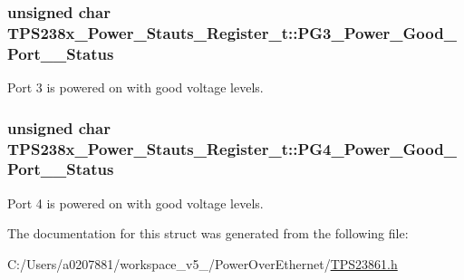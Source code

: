 \hypertarget{struct_t_p_s238x___power___stauts___register__t_a8bd40ecb8603bf9c320cd61a0b1cb0ad}{
\subsubsection[{P\-G3\-\_\-\-Power\-\_\-\-Good\-\_\-\-Port\-\_\-3\-\_\-\-Status}]{\setlength{\rightskip}{0pt plus 5cm}unsigned char T\-P\-S238x\-\_\-\-Power\-\_\-\-Stauts\-\_\-\-Register\-\_\-t\-::\-P\-G3\-\_\-\-Power\-\_\-\-Good\-\_\-\-Port\-\_\-\_\-\-Status}}\label{struct_t_p_s238x___power___stauts___register__t_a8bd40ecb8603bf9c320cd61a0b1cb0ad}


Port 3 is powered on with good voltage levels. 

\hypertarget{struct_t_p_s238x___power___stauts___register__t_a66ca44d4b7146b2a5e01f79042f18162}{
\subsubsection[{P\-G4\-\_\-\-Power\-\_\-\-Good\-\_\-\-Port\-\_\-4\-\_\-\-Status}]{\setlength{\rightskip}{0pt plus 5cm}unsigned char T\-P\-S238x\-\_\-\-Power\-\_\-\-Stauts\-\_\-\-Register\-\_\-t\-::\-P\-G4\-\_\-\-Power\-\_\-\-Good\-\_\-\-Port\-\_\-\_\-\-Status}}\label{struct_t_p_s238x___power___stauts___register__t_a66ca44d4b7146b2a5e01f79042f18162}


Port 4 is powered on with good voltage levels. 



The documentation for this struct was generated from the following file\-:\begin{DoxyCompactItemize}
\item 
C\-:/\-Users/a0207881/workspace\-\_\-v5\-\_/\-Power\-Over\-Ethernet/\hyperlink{_t_p_s23861_8h}{T\-P\-S23861.\-h}\end{DoxyCompactItemize}
